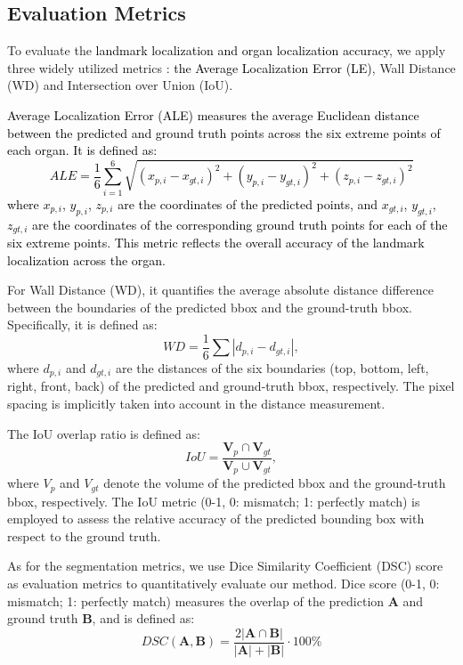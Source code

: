 \documentclass[times,twocolumn,final]{elsarticle}
\begin{document}
 \subsection{Evaluation Metrics}
 To evaluate the \textcolor{black}{landmark localization and organ localization accuracy}, we apply three widely utilized metrics \citep{li2018fast, humpire2018efficient, xu2019efficient, lei2021contrastive}: \textcolor{black}{the Average Localization Error (LE)}, Wall Distance (WD) and Intersection over Union (IoU). 
 \par \textcolor{black}{Average Localization Error (ALE) measures the average Euclidean distance between the predicted and ground truth points across the six extreme points of each organ. It is defined as:
  \begin{equation}
     ALE= \frac{1}{6}\sum_{i=1}^{6} \sqrt{(x_{p,i} - x_{gt,i})^2 + (y_{p,i} - y_{gt,i})^2 + (z_{p,i} - z_{gt,i})^2}
 \end{equation}
where $x_{p,i}$, $y_{p,i}$, $z_{p,i}$ are the coordinates of the predicted points, and $x_{gt,i}$, $y_{gt,i}$, $z_{gt,i}$ are the coordinates of the corresponding ground truth points for each of the six extreme points. This metric reflects the overall accuracy of the landmark localization across the organ.}
 \par For Wall Distance (WD), it quantifies the average absolute distance difference between the boundaries of the predicted bbox and the ground-truth bbox. Specifically, it is defined as:
 \begin{equation}
     WD = \frac{1}{6}\sum{| d_{p,i} - d_{gt,i} |},
 \end{equation}
where $d_{p,i}$ and $d_{gt,i}$ are the distances of the six boundaries (top, bottom, left, right, front, back) of the predicted and ground-truth bbox, respectively. The pixel spacing is implicitly taken into account in the distance measurement.
 \par The IoU overlap ratio is defined as:
 \begin{equation}
     IoU = \frac{\bm{V}_p \cap \bm{V}_{gt}}{\bm{V}_p \cup \bm{V}_{gt}},
 \end{equation}
where $V_p$ and $V_{gt}$ denote the volume of the predicted bbox and the ground-truth bbox, respectively. The IoU metric (0-1, 0: mismatch; 1: perfectly match) is employed to assess the relative accuracy of the predicted bounding box with respect to the ground truth. 
\par 
\par As for the segmentation metrics, we use Dice Similarity Coefficient (DSC) score 
as evaluation metrics to quantitatively evaluate our method. Dice score  (0-1, 0: mismatch; 1: perfectly match) measures the overlap of the prediction $\bm{A}$ and ground truth $\bm{B}$, and is defined as:
\begin{equation}
    DSC(\bm{A}, \bm{B})=\frac{2|\bm{A}\cap\bm{B}|}{|\bm{A}|+|\bm{B}|}\cdot 100\%
    \label{eq12}
\end{equation}
\end{document}
